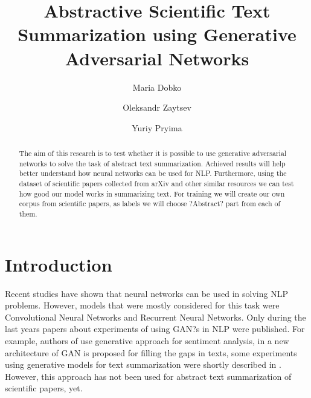 \documentclass[sigplan]{acmart}
\begin{document}
\title{Abstractive Scientific Text Summarization using Generative Adversarial Networks}

\author{Maria Dobko}

\author{Oleksandr Zaytsev}

\author{Yuriy Pryima}

\begin{abstract}
The aim of this research is to test whether it is possible to use generative adversarial networks to solve the task of abstract text summarization. Achieved results will help better understand how neural networks can be used for NLP. Furthermore, using the dataset of scientific papers collected from arXiv and other similar resources we can test how good our model works in summarizing text. For training we will create our own corpus from scientific papers, as labels we will choose ?Abstract? part from each of them. 
\end{abstract}


\maketitle

\section{Introduction}
Recent studies have shown that neural networks can be used in solving NLP problems. However, models that were mostly considered for this task were Convolutional Neural Networks and Recurrent Neural Networks. Only during the last years papers about experiments of using GAN?s in NLP were published. For example, authors of \cite{li-cohn-17} use generative approach for sentiment analysis, in \cite{fedus-18} a new architecture of GAN is proposed for filling the gaps in texts, some experiments using generative models for text summarization were shortly described in \cite{liu-17}. However, this approach has not been used for abstract text summarization of scientific papers, yet.
\end{document}
